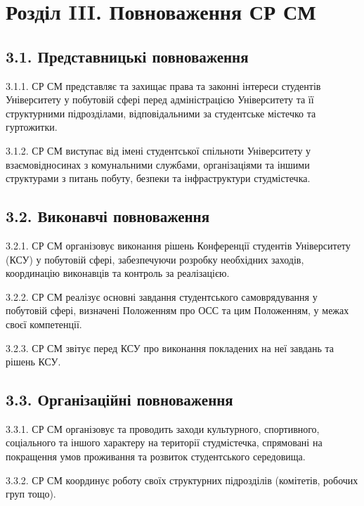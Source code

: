 \section*{Розділ III. Повноваження СР СМ}

\subsection*{3.1. Представницькі повноваження}
    3.1.1. СР СМ представляє та захищає права та законні інтереси студентів Університету у побутовій сфері перед адміністрацією Університету та її структурними підрозділами, відповідальними за студентське містечко та гуртожитки.

    3.1.2. СР СМ виступає від імені студентської спільноти Університету у взаємовідносинах з комунальними службами, організаціями та іншими структурами з питань побуту, безпеки та інфраструктури студмістечка.

\subsection*{3.2. Виконавчі повноваження}
    3.2.1. СР СМ організовує виконання рішень Конференції студентів Університету (КСУ) у побутовій сфері, забезпечуючи розробку необхідних заходів, координацію виконавців та контроль за реалізацією.

    3.2.2. СР СМ реалізує основні завдання студентського самоврядування у побутовій сфері, визначені Положенням про ОСС та цим Положенням, у межах своєї компетенції.

    3.2.3. СР СМ звітує перед КСУ про виконання покладених на неї завдань та рішень КСУ.

\subsection*{3.3. Організаційні повноваження}
    3.3.1. СР СМ організовує та проводить заходи культурного, спортивного, соціального та іншого характеру на території студмістечка, спрямовані на покращення умов проживання та розвиток студентського середовища.

    3.3.2. СР СМ координує роботу своїх структурних підрозділів (комітетів, робочих груп тощо).

